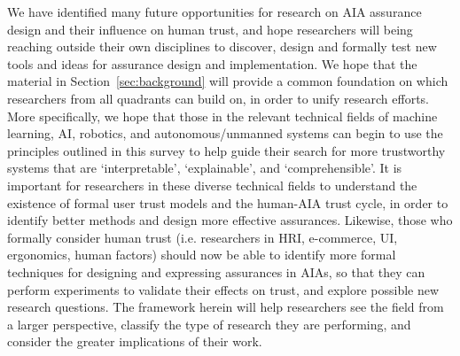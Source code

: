 We have identified many future opportunities for research on AIA assurance design and their influence on human trust, and hope researchers will being reaching outside their own disciplines to discover, design and formally test new tools and ideas for assurance design and implementation.  
We hope that the material in Section~\ref{sec:background} will provide a common foundation on which researchers from all quadrants can build on, in order to unify research efforts. 
More specifically, we hope that those in the relevant technical fields of machine learning, AI, robotics, and autonomous/unmanned systems can begin to use the principles outlined in this survey to help guide their search for more trustworthy systems that are `interpretable', `explainable', and `comprehensible'. 
It is important for researchers in these diverse technical fields to understand the existence of formal user trust models and the human-AIA trust cycle, in order to identify better methods and design more effective assurances. 
Likewise, those who formally consider human trust (i.e. researchers in HRI, e-commerce, UI, ergonomics, human factors) should now be able to identify more formal techniques for designing and expressing assurances in AIAs, so that they can perform experiments to validate their effects on trust, and explore possible new research questions. 
The framework herein will help researchers see the field from a larger perspective, classify the type of research they are performing, and consider the greater implications of their work.
